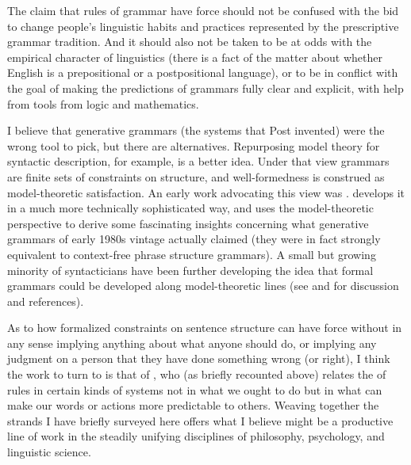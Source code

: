 \documentclass[output=paper]{langscibook}
\begin{document}
The claim that rules of grammar have  force should not be confused with the bid to change people's linguistic habits and practices represented by the prescriptive grammar tradition. And it should also not be taken to be at odds with the empirical character of linguistics (there is a fact of the matter about whether English is a prepositional or a postpositional language), or to be in conflict with the goal of making the predictions of grammars fully clear and explicit, with help from tools from logic and mathematics.

I believe that generative grammars (the systems that Post invented) were the wrong tool to pick, but there are alternatives.  Repurposing model theory for syntactic description, for example, is a better idea. Under that view grammars are finite sets of constraints on structure, and well-formedness is construed as model-theoretic satisfaction. An early work advocating this view was \citet{JohnPost80}. \citet{Rogers98} develops it in a much more technically sophisticated way, and uses the model-theoretic perspective to derive some fascinating insights concerning what generative grammars of early 1980s vintage actually claimed (they were in fact strongly equivalent to context-free phrase structure grammars). A small but growing minority of syntacticians have been further developing the idea that formal grammars could be developed along model-theoretic lines (see \citealt{PullScho01LACL} and \citealt{Pullum13} for discussion and references).

As to how formalized constraints on sentence structure can have  force without in any sense implying anything about what anyone should do, or implying any judgment on a person that they have done something wrong (or right), I think the work to turn to is that of \citet{Millar04}, who (as briefly recounted above) relates the  of rules in certain kinds of systems not in what we ought to do but in what can make our words or actions more predictable to others. Weaving together the strands I have briefly surveyed here offers what I believe might be a productive line of work in the steadily unifying disciplines of philosophy, psychology, and linguistic science.

\sloppy
\printbibliography[heading=subbibliography,notkeyword=this]
\end{document}
